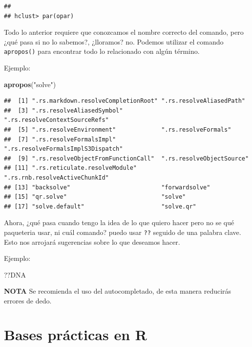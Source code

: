 \documentclass[
]{book}
\newenvironment{Shaded}{\begin{snugshade}}{\end{snugshade}}
\newcommand{\FunctionTok}[1]{\textcolor[rgb]{0.13,0.29,0.53}{\textbf{#1}}}
\newcommand{\NormalTok}[1]{#1}
\newcommand{\StringTok}[1]{\textcolor[rgb]{0.31,0.60,0.02}{#1}}
\begin{document}
\begin{verbatim}
## 
## hclust> par(opar)
\end{verbatim}

Todo lo anterior requiere que conozcamos el nombre correcto del comando, pero ¿qué pasa si no lo sabemos?, ¿lloramos? no.
Podemos utilizar el comando \texttt{apropos()} para encontrar todo lo relacionado con algún término.

Ejemplo:

\begin{Shaded}
\begin{Highlighting}[]
\FunctionTok{apropos}\NormalTok{(}\StringTok{"solve"}\NormalTok{)}
\end{Highlighting}
\end{Shaded}

\begin{verbatim}
##  [1] ".rs.markdown.resolveCompletionRoot" ".rs.resolveAliasedPath"            
##  [3] ".rs.resolveAliasedSymbol"           ".rs.resolveContextSourceRefs"      
##  [5] ".rs.resolveEnvironment"             ".rs.resolveFormals"                
##  [7] ".rs.resolveFormalsImpl"             ".rs.resolveFormalsImplS3Dispatch"  
##  [9] ".rs.resolveObjectFromFunctionCall"  ".rs.resolveObjectSource"           
## [11] ".rs.reticulate.resolveModule"       ".rs.rnb.resolveActiveChunkId"      
## [13] "backsolve"                          "forwardsolve"                      
## [15] "qr.solve"                           "solve"                             
## [17] "solve.default"                      "solve.qr"
\end{verbatim}

Ahora, ¿qué pasa cuando tengo la idea de lo que quiero hacer pero no se qué paqueteria usar, ni cuál comando? puedo usar \texttt{??} seguido de una palabra clave. Esto nos arrojará sugerencias sobre lo que deseamos hacer.

Ejemplo:

\begin{Shaded}
\begin{Highlighting}[]
\NormalTok{??DNA}
\end{Highlighting}
\end{Shaded}

\textbf{NOTA} Se recomienda el uso del autocompletado, de esta manera reducirás errores de dedo.

\chapter{Bases prácticas en R}\label{bases-pruxe1cticas-en-r}
\end{document}
